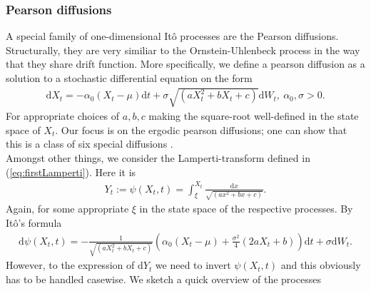 \subsubsection{Pearson diffusions}
A special family of one-dimensional Itô processes are the Pearson diffusions. Structurally, they are very similiar to the Ornstein-Uhlenbeck process in the way that they share drift function. More specifically, we define a pearson diffusion as a solution to a stochastic differential equation on the form
\begin{align}
    \mathrm{d}X_t = -\alpha_0 \left(X_t - \mu\right)\mathrm{d}t + \sigma\sqrt{\left(aX_t^2 + bX_t + c\right)}\mathrm{d}W_t, \: \alpha_0, \sigma > 0. \label{eq:pearsonDiffusion}
\end{align}
For appropriate choices of $a, b, c$ making the square-root well-defined in the state space of $X_t$. Our focus is on the ergodic pearson diffusions; one can show that this is a class of six special diffusions \cite[p.36]{StatisticalMethodsForSDE}. \\
Amongst other things, we consider the Lamperti-transform defined in (\ref{eq:firstLamperti}). Here it is
\begin{align}
    Y_t := \psi\left(X_t, t\right) = \int_{\xi}^{X_t} \frac{\mathrm{d}x}{\sqrt{\left(ax^2 + bx + c\right)}}. \label{eq:lampertiDefinition}
\end{align}
Again, for some appropriate $\xi$ in the state space of the respective processes. By Itô's formula
\begin{align}
    \mathrm{d}\psi\left(X_t, t\right) = - \frac{1}{\sqrt{\left(aX_t^2 + bX_t + c\right)}}\left(\alpha_0\left(X_t - \mu\right) + \frac{\sigma^2}{4}\left(2aX_t + b\right)\right)\mathrm{d}t + \sigma \mathrm{d}W_t.
\end{align}
However, to the expression of $\mathrm{d}Y_t$ we need to invert $\psi\left(X_t, t\right)$ and this obviously has to be handled casewise.
We sketch a quick overview of the processes \cite[p.36]{StatisticalMethodsForSDE}
